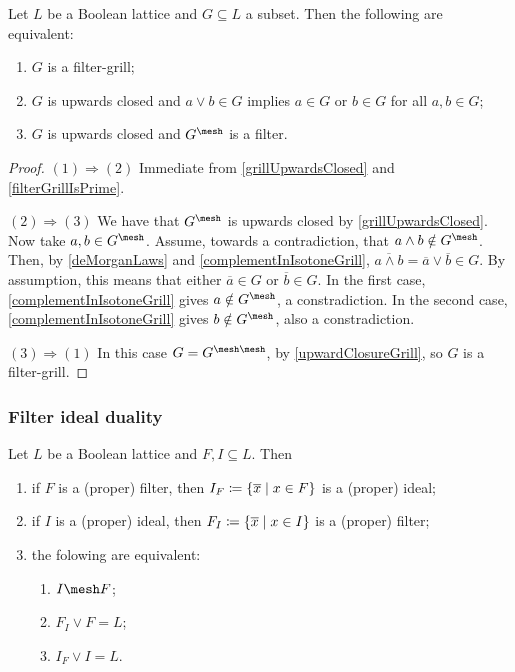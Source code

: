 \begin{proposition} \label{filterGrillEquivalences}
Let $L$ be a Boolean lattice and $G\subseteq L$ a subset. Then the following are equivalent:
\begin{enumerate}
\item $G$ is a filter-grill;
\item $G$ is upwards closed and $a\vee b\in G$ implies $a\in G$ or $b\in G$ for all $a,b\in G$;
\item $G$ is upwards closed and $G^\mesh$ is a filter.
\end{enumerate}
\end{proposition}
\begin{proof}
$(1) \Rightarrow (2)$ Immediate from \ref{grillUpwardsClosed} and \ref{filterGrillIsPrime}.

$(2) \Rightarrow (3)$ We have that $G^\mesh$ is upwards closed by \ref{grillUpwardsClosed}. Now take $a,b\in G^\mesh$. Assume, towards a contradiction, that $a\wedge b\notin G^\mesh$. Then, by \ref{deMorganLaws} and \ref{complementInIsotoneGrill}, $\overline{a\wedge b} = \overline{a}\vee\overline{b} \in G$. By assumption, this means that either $\overline{a}\in G$ or $\overline{b}\in G$. In the first case, \ref{complementInIsotoneGrill} gives $a\notin G^\mesh$, a constradiction. In the second case, \ref{complementInIsotoneGrill} gives $b\notin G^\mesh$, also a constradiction.

$(3) \Rightarrow (1)$ In this case $G = G^{\mesh\mesh}$, by \ref{upwardClosureGrill}, so $G$ is a filter-grill.
\end{proof}

\subsubsection{Filter ideal duality}
\begin{proposition} \label{filterIdealDuality}
Let $L$ be a Boolean lattice and $F,I\subseteq L$. Then
\begin{enumerate}
\item if $F$ is a (proper) filter, then $I_F \defeq \setbuilder{\overline{x}}{x\in F}$ is a (proper) ideal;
\item if $I$ is a (proper) ideal, then $F_I \defeq \setbuilder{\overline{x}}{x\in I}$ is a (proper) filter;
\item the folowing are equivalent:
\begin{enumerate}
\item $I \mesh F$;
\item $F_I \vee F = L$;
\item $I_F \vee I = L$.
\end{enumerate}
\end{enumerate}
\end{proposition}


